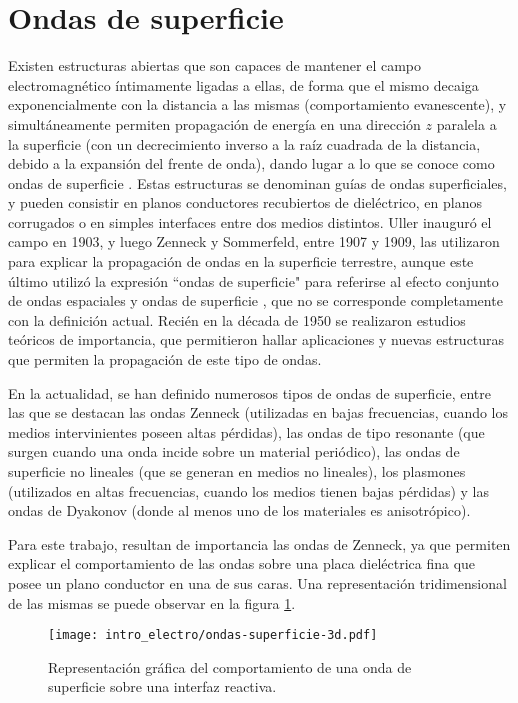 \section{Ondas de superficie}
\label{sec:ondas-de-superficie}
Existen estructuras abiertas que son capaces de mantener el campo electromagnético íntimamente ligadas a ellas, de forma que el mismo decaiga exponencialmente con la distancia a las mismas (comportamiento evanescente), y simultáneamente permiten propagación de energía en una dirección $z$ paralela a la superficie (con un decrecimiento inverso a la raíz cuadrada de la distancia, debido a la expansión del frente de onda), dando lugar a lo que se conoce como ondas de superficie \cite{Barlow:SurfaceWaves}. Estas estructuras se denominan guías de ondas superficiales, y pueden consistir en planos conductores recubiertos de dieléctrico, en planos corrugados o en simples interfaces entre dos medios distintos. Uller inauguró el campo en 1903, y luego Zenneck y Sommerfeld, entre 1907 y 1909, las utilizaron para explicar la propagación de ondas en la superficie terrestre, aunque este último utilizó la expresión ``ondas de superficie" para referirse al efecto conjunto de ondas espaciales y ondas de superficie \cite{Barlow:SurfaceWaves}, que no se corresponde completamente con la definición actual. Recién en la década de 1950 se realizaron estudios teóricos de importancia, que permitieron hallar aplicaciones y nuevas estructuras que permiten la propagación de este tipo de ondas.

En la actualidad, se han definido numerosos tipos de ondas de superficie, entre las que se destacan las ondas Zenneck (utilizadas en bajas frecuencias, cuando los medios intervinientes poseen altas pérdidas), las ondas de tipo resonante (que surgen cuando una onda incide sobre un material periódico), las ondas de superficie no lineales (que se generan en medios no lineales), los plasmones (utilizados en altas frecuencias, cuando los medios tienen bajas pérdidas) y las ondas de Dyakonov (donde al menos uno de los materiales es anisotrópico).

Para este trabajo, resultan de importancia las ondas de Zenneck, ya que permiten explicar el comportamiento de las ondas sobre una placa dieléctrica fina que posee un plano conductor en una de sus caras. Una representación tridimensional de las mismas se puede observar en la figura \ref{fig:onda-superficie-3d}.

\begin{figure}[htp]
	\centering
	\texttt{[image: intro\_electro/ondas-superficie-3d.pdf]}
	\caption{Representación gráfica del comportamiento de una onda de superficie sobre una interfaz reactiva.}
	\label{fig:onda-superficie-3d}
\end{figure}

